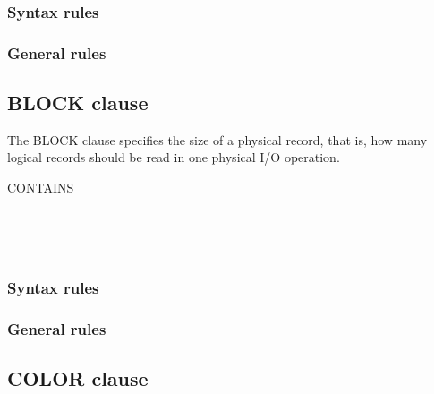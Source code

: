\subsubsection{Syntax rules}

\subsubsection{General rules}

\subsection{BLOCK clause}

The BLOCK clause specifies the size of a physical record, that is, how many logical records should be read in one physical I/O operation.

\begin{syntax}
   CONTAINS \integer
  \begin{0-1}
     \integer
  \end{0-1}
  \begin{0-1}
     \\
  \end{0-1}\\
\end{syntax}

\subsubsection{Syntax rules}

\subsubsection{General rules}

\subsection{COLOR clause}

\begin{syntax}[\miscextcolour]
\end{syntax}

